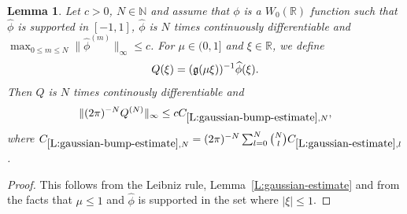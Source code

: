 \documentclass[12pt,reqno]{amsart}
\theoremstyle{plain}
\newtheorem{lemma}[theorem]{Lemma}
\numberwithin{equation}{section}
\theoremstyle{remark}
\newcommand{\uses}[1]{}
\newcommand{\usesdefs}[1]{}
\newcommand{\R}{{\mathbb R}}
\begin{document}
\begin{lemma}\label{L:gaussian-bump-estimate}\uses{L:gaussian-estimate}\usesdefs{gaussian,auto:Wiener-space-definition}
Let $c>0$, $N \in \mathbb N$ and assume that $\phi$ is a $W_0(\R)$ function such that $\widehat{\phi}$ is supported in $[-1,1]$, $\widehat{\phi}$ is $N$ times continuously differentiable and $\max_{0\leq m \leq N} \|\widehat{\phi}^{(m)}\|_{\infty} \leq c$.
For $\mu \in (0,1]$ and $\xi \in \R$, we define
\begin{equation}\label{auto:Gaussian-bump-quotient}
Q(\xi)=(\mathfrak{g}(\mu\xi))^{-1}\widehat{\phi}(\xi).
\end{equation}
Then $Q$ is $N$ times continously differentiable and
\begin{equation}\label{E:estimate-Q}
\|(2\pi)^{-N}Q^{(N)}\|_{\infty} \leq c C_{\ref{L:gaussian-bump-estimate},N},
\end{equation}
where $C_{\ref{L:gaussian-bump-estimate},N}= (2\pi)^{-N}\sum_{l=0}^N \binom{N}{l} C_{\ref{L:gaussian-estimate},l}$.
\end{lemma}

\begin{proof}

This follows from the Leibniz rule, Lemma~\ref{L:gaussian-estimate} and from the facts that $\mu \leq 1$ and $\widehat{\phi}$ is supported in the set where $|\xi|\leq 1$.
\end{proof}
\end{document}
